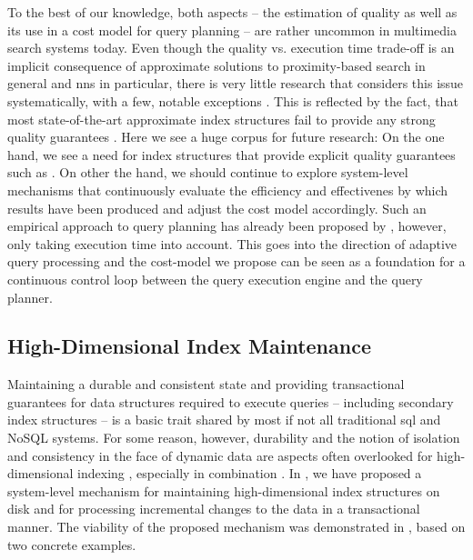 To the best of our knowledge, both aspects -- the estimation of quality as well as its use in a cost model for query planning -- are rather uncommon in multimedia search systems today. Even though the quality vs. execution time trade-off is an implicit consequence of approximate solutions to proximity-based search in general and \acrshort{nns} in particular, there is very little research that considers this issue systematically, with a few, notable exceptions \cite{Weber:2000Trading,Blok2001:Predicting,Siguroardottir:2005Quality}. This is reflected by the fact, that most state-of-the-art approximate index structures fail to provide any strong quality guarantees \cite{Echihabi:2021High}. Here we see a huge corpus for future research: On the one hand, we see a need for index structures that provide explicit quality guarantees such as \cite{Lu:2020VHP}. On other the hand, we should continue to explore system-level mechanisms that continuously evaluate the efficiency and effectivenes by which results have been produced and adjust the cost model accordingly. Such an empirical approach to query planning has already been proposed by \cite{Giangreco:2018Database}, however, only taking execution time into account. This goes into the direction of adaptive query processing \cite{Deshpande:2007Adaptive} and the cost-model we propose can be seen as a foundation for a continuous control loop between the query execution engine and the query planner.

\subsection{High-Dimensional Index Maintenance}

Maintaining a durable and consistent state and providing transactional guarantees for data structures required to execute queries -- including secondary index structures -- is a basic trait shared by most if not all traditional \acrshort{sql} and NoSQL systems. For some reason, however, durability and the notion of isolation and consistency in the face of dynamic data are aspects often overlooked for high-dimensional indexing \cite{Amsaleg:2014Database,Hojsgaard:2019Index}, especially in combination \cite{Amsaleg:2014Database}. In , we have proposed a system-level mechanism for maintaining high-dimensional index structures on disk and for processing incremental changes to the data in a transactional manner. The viability of the proposed mechanism was demonstrated in , based on two concrete examples.

